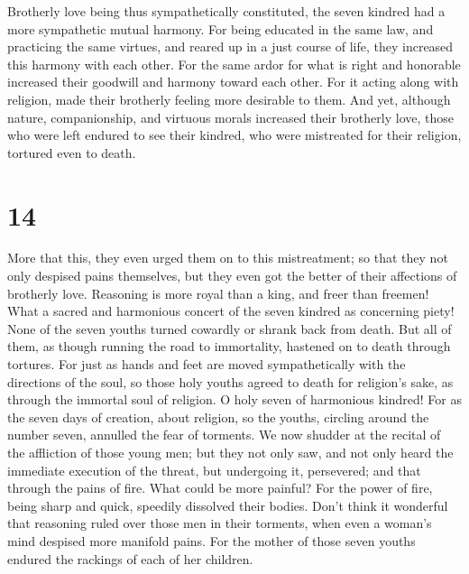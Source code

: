  Brotherly love being thus sympathetically constituted,
the seven kindred had a more sympathetic mutual harmony. 
For being educated in the same law, and practicing the same virtues, and
reared up in a just course of life, they increased this harmony with
each other.  For the same ardor for what is right and
honorable increased their goodwill and harmony toward each other.
 For it acting along with religion, made their brotherly
feeling more desirable to them.  And yet, although
nature, companionship, and virtuous morals increased their brotherly
love, those who were left endured to see their kindred, who were
mistreated for their religion, tortured even to death.

\hypertarget{section-13}{%
\section{14}\label{section-13}}

 More that this, they even urged them on to this
mistreatment; so that they not only despised pains themselves, but they
even got the better of their affections of brotherly love.
 Reasoning is more royal than a king, and freer than
freemen!  What a sacred and harmonious concert of the
seven kindred as concerning piety!  None of the seven
youths turned cowardly or shrank back from death.  But all
of them, as though running the road to immortality, hastened on to death
through tortures.  For just as hands and feet are moved
sympathetically with the directions of the soul, so those holy youths
agreed to death for religion's sake, as through the immortal soul of
religion.  O holy seven of harmonious kindred! For as the
seven days of creation, about religion,  so the youths,
circling around the number seven, annulled the fear of torments.
 We now shudder at the recital of the affliction of those
young men; but they not only saw, and not only heard the immediate
execution of the threat, but undergoing it, persevered; and that through
the pains of fire.  What could be more painful? For the
power of fire, being sharp and quick, speedily dissolved their bodies.
 Don't think it wonderful that reasoning ruled over those
men in their torments, when even a woman's mind despised more manifold
pains.  For the mother of those seven youths endured the
rackings of each of her children.

